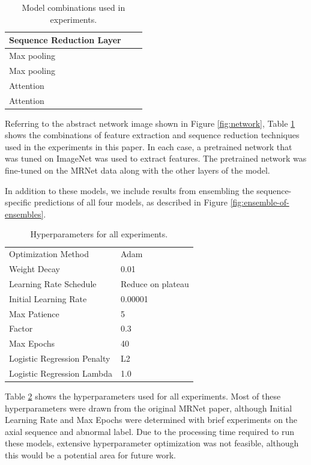\documentclass[conference]{IEEEtran}
\begin{document}
\begin{table}
\begin{center}
\begin{tabular}{|l|c|c|}
\hline
Sequence Reduction Layer \\
\hline
Max pooling \\
Max pooling \\
Attention \\
Attention \\
\hline
\end{tabular}
\end{center}
\caption{Model combinations used in experiments.}
\label{tab:models}
\end{table}

Referring to the abstract network image shown in Figure \ref{fig:network}, Table \ref{tab:models} shows the combinations of feature extraction and sequence reduction techniques used in the experiments in this paper. In each case, a pretrained network that was tuned on ImageNet was used to extract features. The pretrained network was fine-tuned on the MRNet data along with the other layers of the model.

In addition to these models, we include results from ensembling the sequence-specific predictions of all four models, as described in Figure \ref{fig:ensemble-of-ensembles}.

\begin{table}
\begin{center}
\begin{tabular}{|l|l|}
\hline
Optimization Method & Adam \\
Weight Decay & 0.01 \\
\hline
Learning Rate Schedule & Reduce on plateau \\
Initial Learning Rate & 0.00001 \\
Max Patience & 5 \\
Factor & 0.3 \\
\hline
Max Epochs & 40 \\
\hline
Logistic Regression Penalty & L2 \\
Logistic Regression Lambda & 1.0 \\
\hline

\end{tabular}
\end{center}
\caption{Hyperparameters for all experiments.}
\label{tab:hyperparams}
\end{table}

Table \ref{tab:hyperparams} shows the hyperparameters used for all experiments. Most of these hyperparameters were drawn from the original MRNet paper, although Initial Learning Rate and Max Epochs were determined with brief experiments on the axial sequence and abnormal label. Due to the processing time required to run these models, extensive hyperparameter optimization was not feasible, although this would be a potential area for future work.
\end{document}

